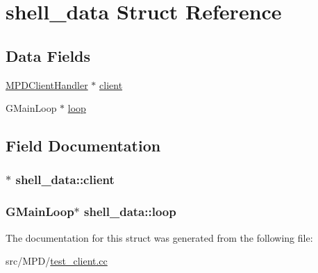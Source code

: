 \hypertarget{structshell__data}{
\section{shell\-\_\-data \-Struct \-Reference}
\label{structshell__data}
}
\subsection*{\-Data \-Fields}
\begin{DoxyCompactItemize}
\item 
\hyperlink{classMPDClientHandler}{\-M\-P\-D\-Client\-Handler} $\ast$ \hyperlink{structshell__data_ade9283debf46ba0ad03356e5e9076aac}{client}
\item 
\-G\-Main\-Loop $\ast$ \hyperlink{structshell__data_ad11766f1557a40edf68f9390339caeb0}{loop}
\end{DoxyCompactItemize}


\subsection{\-Field \-Documentation}
\hypertarget{structshell__data_ade9283debf46ba0ad03356e5e9076aac}{
\subsubsection[{client}]{$\ast$ {\bf shell\-\_\-data\-::client}}}
\label{structshell__data_ade9283debf46ba0ad03356e5e9076aac}
\hypertarget{structshell__data_ad11766f1557a40edf68f9390339caeb0}{
\subsubsection[{loop}]{\setlength{\rightskip}{0pt plus 5cm}\-G\-Main\-Loop$\ast$ {\bf shell\-\_\-data\-::loop}}}
\label{structshell__data_ad11766f1557a40edf68f9390339caeb0}


\-The documentation for this struct was generated from the following file\-:\begin{DoxyCompactItemize}
\item 
src/\-M\-P\-D/\hyperlink{test__client_8cc}{test\-\_\-client.\-cc}\end{DoxyCompactItemize}

